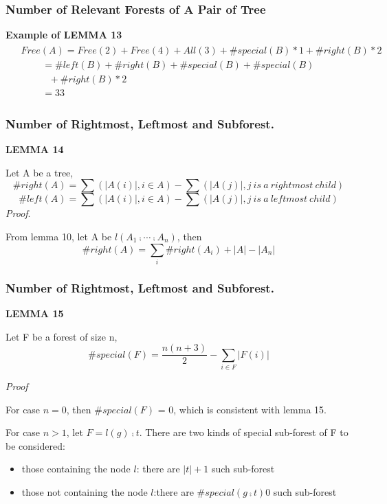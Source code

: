 \documentclass{beamer}
\begin{document}
\begin{frame}
\frametitle{Number of Relevant Forests of A Pair of Tree}
\textbf{Example of LEMMA 13}
\begin{eqnarray*}
\begin{split}
& Free(A) = Free(2) + Free(4) + All(3) +\#special(B) * 1 + \#right(B) * 2\\
& \ \ \ \ \ \ \ \ \ \ =\#left(B) +\#right(B) +\#special(B) + \#special(B) \\
& \ \ \ \ \ \ \ \ \ \ \ \ \ + \#right(B) * 2\\
& \ \ \ \ \ \ \ \ \ \ =33
\end{split}
\end{eqnarray*}
\end{frame}


\begin{frame}
\frametitle{Number of Rightmost, Leftmost and Subforest.}
\textbf{LEMMA 14}

Let A be a tree,
\begin{displaymath}
\#right(A) = \sum(\left\vert A(i) \right\vert, i \in A) - \sum(\left\vert A(j) \right\vert, j\ is\ a\ rightmost\ child)
\end{displaymath}
\begin{displaymath}
\#left(A) = \sum(\left\vert A(i) \right\vert, i \in A) - \sum(\left\vert A(j) \right\vert, j\ is\ a\ leftmost\ child)
\end{displaymath}
\emph{Proof}.

From lemma 10, let A be $l(A_1 \comp \cdots \comp A_n)$, then 
\begin{displaymath}
\#right(A)=\sum_i\#right(A_i) + \left\vert A \right\vert - \left\vert A_n \right\vert
\end{displaymath}
\end{frame}


\begin{frame}
\frametitle{Number of Rightmost, Leftmost and Subforest.}
\textbf{LEMMA 15}

Let F be a forest of size n,
\begin{displaymath}
\#special(F) = \frac{n(n+3)}{2} - \sum_{i \in F} \left\vert F(i) \right\vert
\end{displaymath}

\emph{Proof}

For case $n = 0$, then $\#special(F)$ = 0, which is consistent with lemma 15.

\vspace{12pt} 
For case $n > 1$, let $F = l(g) \comp t$. There are two kinds of special sub-forest of F to be considered:
\begin{itemize}
\item those containing the node $l$: there are $\left\vert t \right\vert + 1$ such sub-forest
\item those not containing the node $l$:there are $\#special(g \comp t)0$ such sub-forest
\end{itemize}
\end{frame}
\end{document}
